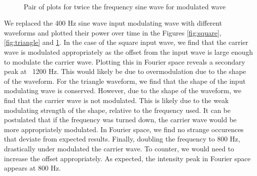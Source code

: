 \documentclass[aps,prl,reprint,10pt,amsmath,amssymb,superscriptaddress,a4paper]{revtex4-2}
\begin{document}
\begin{figure} [!htbp]
     \\
    \caption{Pair of plots for twice the frequency sine wave for modulated wave}
    \label{fig:800sine}
\end{figure}

We replaced the 400 Hz sine wave input modulating wave with different waveforms and plotted their power over time in the Figures \ref{fig:square}, 
\ref{fig:triangle} and \ref{fig:800sine}. In the case of the square input wave, we find that the carrier wave is modulated appropriately as the offset 
from the input wave is large enough to modulate the carrier wave. Plotting this in Fourier space reveals a secondary peak at ~1200 Hz. This would likely 
be due to overmodulation due to the shape of the waveform. For the triangle waveform, we find that the shape of the input modulating wave is conserved. 
However, due to the shape of the waveform, we find that the carrier wave is not modulated. This is likely due to the weak modulating strength of the shape, 
relative to the frequency used. It can be postulated that if the frequency was turned down, the carrier wave would be more appropriately modulated. In Fourier 
space, we find no strange occurences that deviate from expected results. Finally, doubling the frequency to 800 Hz, drastically under modulated the carrier wave.
To counter, we would need to increase the offset appropriately. As expected, the intensity peak in Fourier space appears at 800 Hz.
\end{document}
